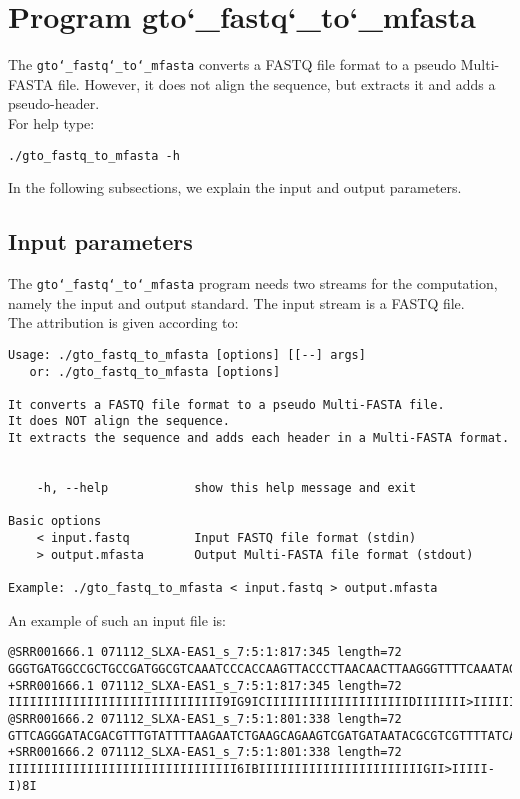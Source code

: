 \section{Program gto\char`_fastq\char`_to\char`_mfasta}
The \texttt{gto\char`_fastq\char`_to\char`_mfasta} converts a FASTQ file format to a pseudo Multi-FASTA file. However, it does not align the sequence, but extracts it and adds a pseudo-header.\\
For help type:
\begin{lstlisting}
./gto_fastq_to_mfasta -h
\end{lstlisting}
In the following subsections, we explain the input and output parameters.

\subsection*{Input parameters}

The \texttt{gto\char`_fastq\char`_to\char`_mfasta} program needs two streams for the computation, namely the input and output standard. The input stream is a FASTQ file.\\
The attribution is given according to:
\begin{lstlisting}
Usage: ./gto_fastq_to_mfasta [options] [[--] args]
   or: ./gto_fastq_to_mfasta [options]

It converts a FASTQ file format to a pseudo Multi-FASTA file.
It does NOT align the sequence.
It extracts the sequence and adds each header in a Multi-FASTA format.


    -h, --help            show this help message and exit

Basic options
    < input.fastq         Input FASTQ file format (stdin)
    > output.mfasta       Output Multi-FASTA file format (stdout)

Example: ./gto_fastq_to_mfasta < input.fastq > output.mfasta
\end{lstlisting}
An example of such an input file is:
\begin{lstlisting}
@SRR001666.1 071112_SLXA-EAS1_s_7:5:1:817:345 length=72
GGGTGATGGCCGCTGCCGATGGCGTCAAATCCCACCAAGTTACCCTTAACAACTTAAGGGTTTTCAAATAGA
+SRR001666.1 071112_SLXA-EAS1_s_7:5:1:817:345 length=72
IIIIIIIIIIIIIIIIIIIIIIIIIIIIII9IG9ICIIIIIIIIIIIIIIIIIIIIDIIIIIII>IIIIII/
@SRR001666.2 071112_SLXA-EAS1_s_7:5:1:801:338 length=72
GTTCAGGGATACGACGTTTGTATTTTAAGAATCTGAAGCAGAAGTCGATGATAATACGCGTCGTTTTATCAT
+SRR001666.2 071112_SLXA-EAS1_s_7:5:1:801:338 length=72
IIIIIIIIIIIIIIIIIIIIIIIIIIIIIIII6IBIIIIIIIIIIIIIIIIIIIIIIIGII>IIIII-I)8I
\end{lstlisting}

